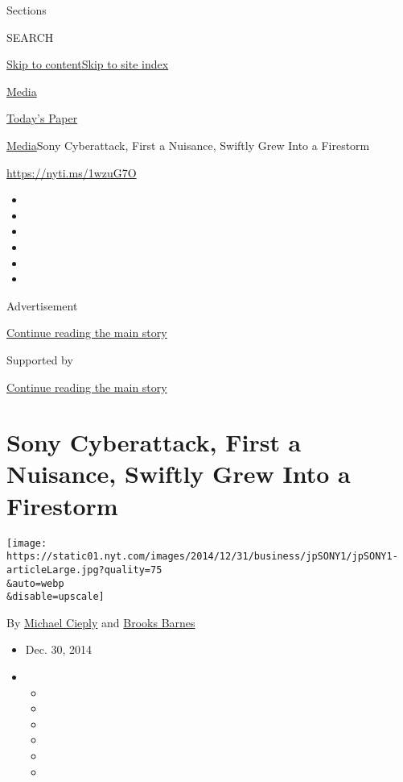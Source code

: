 Sections

SEARCH

\protect\hyperlink{site-content}{Skip to
content}\protect\hyperlink{site-index}{Skip to site index}

\href{https://www.nytimes.com/pages/business/media/index.html}{Media}

\href{https://myaccount.nytimes.com/auth/login?response_type=cookie\&client_id=vi}{}

\href{https://www.nytimes.com/section/todayspaper}{Today's Paper}

\href{/pages/business/media/index.html}{Media}\textbar{}Sony
Cyberattack, First a Nuisance, Swiftly Grew Into a Firestorm

\url{https://nyti.ms/1wzuG7O}

\begin{itemize}
\item
\item
\item
\item
\item
\item
\end{itemize}

Advertisement

\protect\hyperlink{after-top}{Continue reading the main story}

Supported by

\protect\hyperlink{after-sponsor}{Continue reading the main story}

\hypertarget{sony-cyberattack-first-a-nuisance-swiftly-grew-into-a-firestorm}{%
\section{Sony Cyberattack, First a Nuisance, Swiftly Grew Into a
Firestorm}\label{sony-cyberattack-first-a-nuisance-swiftly-grew-into-a-firestorm}}

\texttt{[image: https://static01.nyt.com/images/2014/12/31/business/jpSONY1/jpSONY1-articleLarge.jpg?quality=75\\\&auto=webp\\\&disable=upscale]}

By \href{http://www.nytimes.com/by/michael-cieply}{Michael Cieply} and
\href{http://www.nytimes.com/by/brooks-barnes}{Brooks Barnes}

\begin{itemize}
\item
  Dec. 30, 2014
\item
  \begin{itemize}
  \item
  \item
  \item
  \item
  \item
  \item
  \end{itemize}
\end{itemize}

